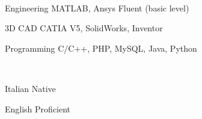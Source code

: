 \vspace{-\acvSectionTopSkip}

\begin{minipage}[t]{0.60\textwidth}

  \\

  \begin{cvskills}

    \cvskill
    {Engineering }
    {MATLAB, Ansys Fluent (basic level)}

    \cvskill
    {3D CAD }
    {CATIA V5, SolidWorks, Inventor}

    \cvskill
    {Programming }
    {C/C++, PHP, MySQL, Java, Python}

  \end{cvskills}

\end{minipage}
%
\hfill
%
\begin{minipage}[t]{0.35\textwidth}

  \\

  \begin{cvskills}

    \cvskill
    {Italian}
    {Native}

    \cvskill
    {English}
    {Proficient}


  \end{cvskills}

\end{minipage}

